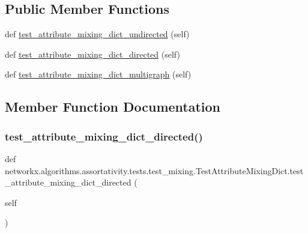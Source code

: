 \subsection*{Public Member Functions}
\begin{DoxyCompactItemize}
\item 
def \hyperlink{classnetworkx_1_1algorithms_1_1assortativity_1_1tests_1_1test__mixing_1_1TestAttributeMixingDict_a84947cc7f9c3f38bf71661be1f4c060e}{test\+\_\+attribute\+\_\+mixing\+\_\+dict\+\_\+undirected} (self)
\item 
def \hyperlink{classnetworkx_1_1algorithms_1_1assortativity_1_1tests_1_1test__mixing_1_1TestAttributeMixingDict_a3d521aeb68dc34f67102c8b21e049595}{test\+\_\+attribute\+\_\+mixing\+\_\+dict\+\_\+directed} (self)
\item 
def \hyperlink{classnetworkx_1_1algorithms_1_1assortativity_1_1tests_1_1test__mixing_1_1TestAttributeMixingDict_a498684aaefff3671e503ec27144aeab1}{test\+\_\+attribute\+\_\+mixing\+\_\+dict\+\_\+multigraph} (self)
\end{DoxyCompactItemize}


\subsection{Member Function Documentation}
\mbox{\label{classnetworkx_1_1algorithms_1_1assortativity_1_1tests_1_1test__mixing_1_1TestAttributeMixingDict_a3d521aeb68dc34f67102c8b21e049595}} 
\subsubsection{\texorpdfstring{test\+\_\+attribute\+\_\+mixing\+\_\+dict\+\_\+directed()}{test\_attribute\_mixing\_dict\_directed()}}
{\footnotesize\ttfamily def networkx.\+algorithms.\+assortativity.\+tests.\+test\+\_\+mixing.\+Test\+Attribute\+Mixing\+Dict.\+test\+\_\+attribute\+\_\+mixing\+\_\+dict\+\_\+directed (\begin{DoxyParamCaption}\item[{}]{self }\end{DoxyParamCaption})}

